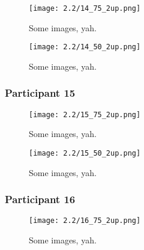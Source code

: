 \begin{figure}[h]
	\begin{center}
	\texttt{[image: 2.2/14\_75\_2up.png]}
	\caption{Some images, yah.}
	\end{center}
\end{figure}

\clearpage

\begin{figure}[h]
	\begin{center}
	\texttt{[image: 2.2/14\_50\_2up.png]}
	\caption{Some images, yah.}
	\end{center}
\end{figure}


\clearpage

\subsubsection{Participant 15}

\begin{figure}[h]
	\begin{center}
	\texttt{[image: 2.2/15\_75\_2up.png]}
	\caption{Some images, yah.}
	\end{center}
\end{figure}

\clearpage

\begin{figure}[h]
	\begin{center}
	\texttt{[image: 2.2/15\_50\_2up.png]}
	\caption{Some images, yah.}
	\end{center}
\end{figure}


\clearpage

\subsubsection{Participant 16}

\begin{figure}[h]
	\begin{center}
	\texttt{[image: 2.2/16\_75\_2up.png]}
	\caption{Some images, yah.}
	\end{center}
\end{figure}

